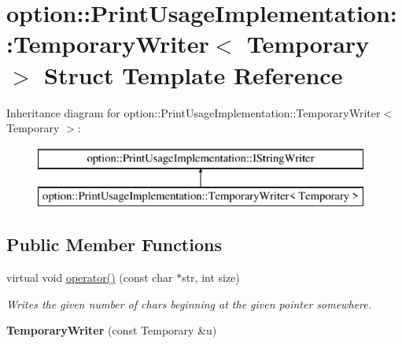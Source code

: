 \hypertarget{structoption_1_1PrintUsageImplementation_1_1TemporaryWriter}{}\section{option\+:\+:Print\+Usage\+Implementation\+:\+:Temporary\+Writer$<$ Temporary $>$ Struct Template Reference}
\label{structoption_1_1PrintUsageImplementation_1_1TemporaryWriter}
Inheritance diagram for option\+:\+:Print\+Usage\+Implementation\+:\+:Temporary\+Writer$<$ Temporary $>$\+:\begin{figure}[H]
\begin{center}
\leavevmode
\includegraphics[height=2.000000cm]{structoption_1_1PrintUsageImplementation_1_1TemporaryWriter}
\end{center}
\end{figure}
\subsection*{Public Member Functions}
\begin{DoxyCompactItemize}
\item 
\mbox{\label{structoption_1_1PrintUsageImplementation_1_1TemporaryWriter_a674751ddfff63852b36c754878276b02}} 
virtual void \hyperlink{structoption_1_1PrintUsageImplementation_1_1TemporaryWriter_a674751ddfff63852b36c754878276b02}{operator()} (const char $\ast$str, int size)
\begin{DoxyCompactList}\small\item\em Writes the given number of chars beginning at the given pointer somewhere. \end{DoxyCompactList}\item 
\mbox{\label{structoption_1_1PrintUsageImplementation_1_1TemporaryWriter_a0c65740b5a897ca2a2465d1c112882a8}} 
{\bfseries Temporary\+Writer} (const Temporary \&u)
\end{DoxyCompactItemize}

